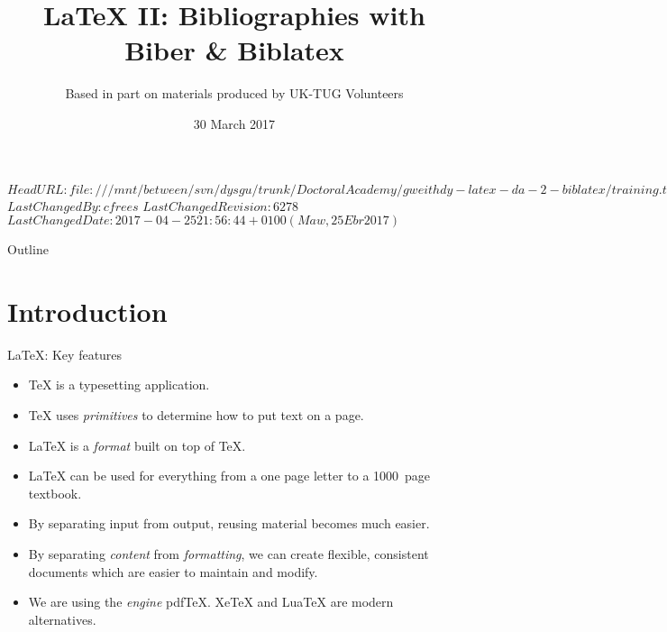 \svnidlong
{$HeadURL: file:///mnt/between/svn/dysgu/trunk/DoctoralAcademy/gweithdy-latex-da-2-biblatex/training.tex $}
{$LastChangedBy: cfrees $}
{$LastChangedRevision: 6278 $}
{$LastChangedDate: 2017-04-25 21:56:44 +0100 (Maw, 25 Ebr 2017) $}



\title{\LaTeX{} II: Bibliographies with Biber \& Biblatex}
\subtitle{Based in part on materials produced by UK-TUG Volunteers}
\date{ 30 March 2017}




\begin{frame}
  \titlepage
\end{frame}

\maketitle


\tableofcontents

%
{
  \begin{frame}{Outline}
    \tableofcontents
  \end{frame}
}

%

\section{Introduction}

\begin{frame}{\LaTeX{}: Key features}

  \begin{itemize}
    \item \TeX{} is a typesetting application.
    \item \TeX{} uses \emph{primitives} to determine how to put text on a page.
    \item \LaTeX{} is  a \emph{format} built on top of \TeX{}.
    \item \LaTeX{} can be used for everything from a one page letter to a 1000~page textbook.
    \item By separating input from output, reusing material becomes much easier.
    \item By separating \emph{content} from \emph{formatting}, we can create flexible, consistent documents which are easier to maintain and modify.
    \item We are using the \emph{engine} pdf\TeX{}.
    Xe\TeX{} and Lua\TeX{} are modern alternatives.
  \end{itemize}

\end{frame}

